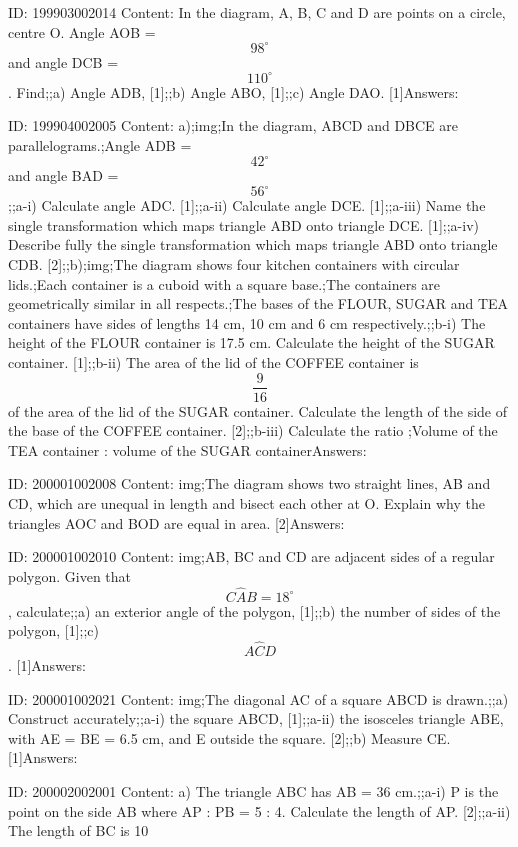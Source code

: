 \documentclass{article}
\begin{document}
ID: 199903002014
Content:
In the diagram, A, B, C and D are points on a circle, centre O. Angle AOB = $$98^{\circ}$$ and angle DCB = $$110^{\circ}$$. Find;;a) Angle ADB, [1];;b) Angle ABO, [1];;c) Angle DAO. [1]Answers:

ID: 199904002005
Content:
a);img;In the diagram, ABCD and DBCE are parallelograms.;Angle ADB = $$42^{\circ}$$ and angle BAD = $$56^{\circ}$$;;a-i) Calculate angle ADC. [1];;a-ii) Calculate angle DCE. [1];;a-iii) Name the single transformation which maps triangle ABD onto triangle DCE. [1];;a-iv) Describe fully the single transformation which maps triangle ABD onto triangle CDB. [2];;b);img;The diagram shows four kitchen containers with circular lids.;Each container is a cuboid with a square base.;The containers are geometrically similar in all respects.;The bases of the FLOUR, SUGAR and TEA containers have sides of lengths 14 cm, 10 cm and 6 cm respectively.;;b-i) The height of the FLOUR container is 17.5 cm. Calculate the height of the SUGAR container. [1];;b-ii) The area of the lid of the COFFEE container is $$\frac{9}{16}$$ of the area of the lid of the SUGAR container. Calculate the length of the side of the base of the COFFEE container. [2];;b-iii) Calculate the ratio ;Volume of the TEA container : volume of the SUGAR containerAnswers:

ID: 200001002008
Content:
img;The diagram shows two straight lines, AB and CD, which are unequal in length and bisect each other at O. Explain why the triangles AOC and BOD are equal in area. [2]Answers:

ID: 200001002010
Content:
img;AB, BC and CD are adjacent sides of a regular polygon. Given that $$C \hat AB=18^{\circ}$$, calculate;;a) an exterior angle of the polygon, [1];;b) the number of sides of the polygon, [1];;c) $$A \hat CD$$. [1]Answers:

ID: 200001002021
Content:
img;The diagonal AC of a square ABCD is drawn.;;a) Construct accurately;;a-i) the square ABCD, [1];;a-ii) the isosceles triangle ABE, with AE = BE = 6.5 cm, and E outside the square. [2];;b) Measure CE. [1]Answers:

ID: 200002002001
Content:
a) The triangle ABC has AB = 36 cm.;;a-i) P is the point on the side AB where AP : PB = 5 : 4. Calculate the length of AP. [2];;a-ii) The length of BC is 10%
\end{document}

